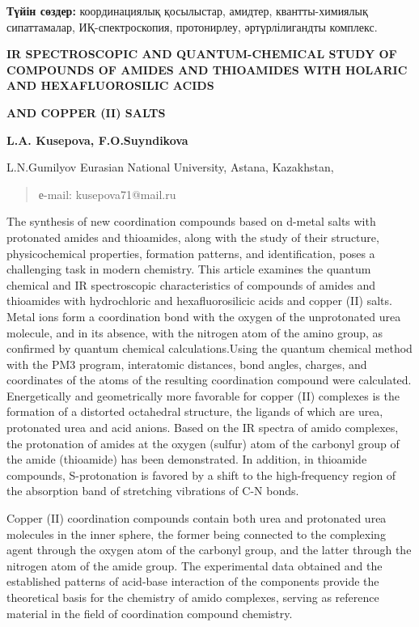 {\bfseries Түйін сөздер:} координациялық қосылыстар, амидтер,
квантты-химиялық сипаттамалар, ИҚ-спектроскопия, протонирлеу,
әртүрлілигандты комплекс.

{\bfseries IR SPECTROSCOPIC AND QUANTUM-CHEMICAL STUDY OF COMPOUNDS OF
AMIDES AND THIOAMIDES WITH HOLARIC AND HEXAFLUOROSILIC ACIDS}

{\bfseries AND COPPER (II) SALTS}

{\bfseries L.A. Kusepova, F.O.Suyndikova}

L.N.Gumilyov Eurasian National University, Astana, Kazakhstan,

\begin{quote}
е-mail: kusepova71@mail.ru
\end{quote}

The synthesis of new coordination compounds based on d-metal salts with
protonated amides and thioamides, along with the study of their
structure, physicochemical properties, formation patterns, and
identification, poses a challenging task in modern chemistry. This
article examines the quantum chemical and IR spectroscopic
characteristics of compounds of amides and thioamides with hydrochloric
and hexafluorosilicic acids and copper (II) salts. Metal ions form a
coordination bond with the oxygen of the unprotonated urea molecule, and
in its absence, with the nitrogen atom of the amino group, as confirmed
by quantum chemical calculations.Using the quantum chemical method with
the PM3 program, interatomic distances, bond angles, charges, and
coordinates of the atoms of the resulting coordination compound were
calculated. Energetically and geometrically more favorable for copper
(II) complexes is the formation of a distorted octahedral structure, the
ligands of which are urea, protonated urea and acid anions. Based on the
IR spectra of amido complexes, the protonation of amides at the oxygen
(sulfur) atom of the carbonyl group of the amide (thioamide) has been
demonstrated. In addition, in thioamide compounds, S-protonation is
favored by a shift to the high-frequency region of the absorption band
of stretching vibrations of C-N bonds.

Copper (II) coordination compounds contain both urea and protonated urea
molecules in the inner sphere, the former being connected to the
complexing agent through the oxygen atom of the carbonyl group, and the
latter through the nitrogen atom of the amide group. The experimental
data obtained and the established patterns of acid-base interaction of
the components provide the theoretical basis for the chemistry of amido
complexes, serving as reference material in the field of coordination
compound chemistry.

